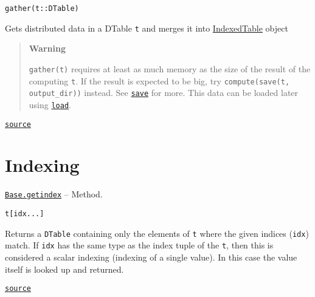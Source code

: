 \documentclass{memoir}
\begin{document}
\begin{adjustwidth}{2em}{0pt}


\begin{lstlisting}
gather(t::DTable)
\end{lstlisting}

Gets distributed data in a DTable \texttt{t} and merges it into \href{\#IndexedTables.IndexedTable}{IndexedTable} object

\begin{quote}
\textbf{Warning}

\texttt{gather(t)} requires at least as much memory as the size of the result of the computing \texttt{t}. If the result is expected to be big, try \texttt{compute(save(t, {\textquotedbl}output\_dir{\textquotedbl}))} instead. See \href{tutorial.html\#JuliaDB.save}{\texttt{save}} for more. This data can be loaded later using \href{tutorial.html\#JuliaDB.load}{\texttt{load}}.

\end{quote}


\href{https://github.com/JuliaComputing/JuliaDB.jl/tree/9e65f8c3b0e9c2e27c3334a093a5aefc6c7d1246/src/dtable.jl#L77-L88}{\texttt{source}}


\end{adjustwidth}

\hypertarget{14566118977838625303}{}


\section{Indexing}


\hypertarget{10948394587154791156}{} 
\hyperlink{10948394587154791156}{\texttt{Base.getindex}}  -- {Method.}

\begin{adjustwidth}{2em}{0pt}


\begin{lstlisting}
t[idx...]
\end{lstlisting}

Returns a \texttt{DTable} containing only the elements of \texttt{t} where the given indices (\texttt{idx}) match. If \texttt{idx} has the same type as the index tuple of the \texttt{t}, then this is considered a scalar indexing (indexing of a single value). In this case the value itself is looked up and returned.



\href{https://github.com/JuliaComputing/JuliaDB.jl/tree/9e65f8c3b0e9c2e27c3334a093a5aefc6c7d1246/src/indexing.jl#L2-L10}{\texttt{source}}


\end{adjustwidth}
\end{document}
